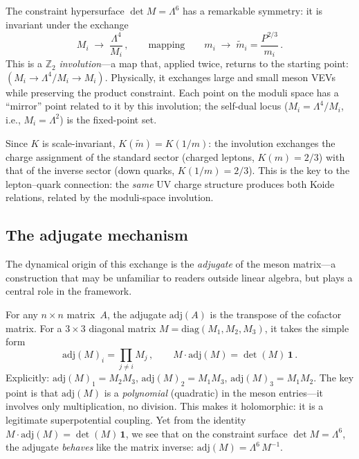 \documentclass[12pt,a4paper]{article}
\makeatletter
\newcommand{\adj}{\mathrm{adj}}
\newcommand{\diag}{\mathrm{diag}}
\newcommand{\ie}{i.e.\@}
\makeatother
\begin{document}
The constraint hypersurface $\det M = \Lambda^6$ has a remarkable
symmetry: it is invariant under the exchange
\begin{equation}
  M_i \;\to\; \frac{\Lambda^4}{M_i}\,,
  \qquad\text{mapping}\qquad
  m_i \;\to\; \tilde{m}_i = \frac{P^{2/3}}{m_i}\,.
  \label{eq:involution}
\end{equation}
This is a $\mathbb{Z}_2$ \emph{involution}---a map that, applied
twice, returns to the starting point: $(M_i \to \Lambda^4/M_i
\to M_i)$. Physically, it exchanges large and small meson VEVs
while preserving the product constraint. Each point on the moduli
space has a ``mirror'' point related to it by this involution;
the self-dual locus ($M_i = \Lambda^4/M_i$, \ie,
$M_i = \Lambda^2$) is the fixed-point set.

Since $K$ is scale-invariant, $K(\tilde{m}) = K(1/m)$: the involution
exchanges the charge assignment of the standard sector (charged leptons,
$K(m)=2/3$) with that of the inverse sector (down quarks,
$K(1/m)=2/3$). This is the key to the lepton--quark connection:
the \emph{same} UV charge structure produces both Koide relations,
related by the moduli-space involution.

\subsection{The adjugate mechanism}

The dynamical origin of this exchange is the \emph{adjugate} of the
meson matrix---a construction that may be unfamiliar to readers
outside linear algebra, but plays a central role in the framework.

For any $n\times n$ matrix~$A$, the adjugate $\adj(A)$ is the
transpose of the cofactor matrix. For a $3\times3$ diagonal
matrix $M = \diag(M_1, M_2, M_3)$, it takes the simple form
\begin{equation}
  \adj(M)_i = \prod_{j \neq i} M_j\,,
  \qquad
  M \cdot \adj(M) = \det(M)\,\mathbf{1}\,.
  \label{eq:adjugate}
\end{equation}
Explicitly: $\adj(M)_1 = M_2 M_3$, $\adj(M)_2 = M_1 M_3$,
$\adj(M)_3 = M_1 M_2$. The key point is that $\adj(M)$ is a
\emph{polynomial} (quadratic) in the meson entries---it involves
only multiplication, no division. This makes it holomorphic: it
is a legitimate superpotential coupling. Yet from the identity
$M \cdot \adj(M) = \det(M)\,\mathbf{1}$, we see that on the
constraint surface $\det M = \Lambda^6$, the adjugate
\emph{behaves} like the matrix inverse:
$\adj(M) = \Lambda^6\,M^{-1}$.
\end{document}
